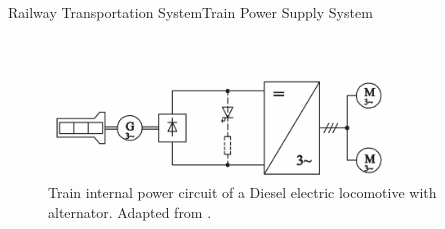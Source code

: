 \begin{frame}{Railway Transportation System}{Train Power Supply System}
\begin{minipage}[t]{0.24\linewidth} ~ \end{minipage}
\begin{minipage}[t]{0.48\linewidth}
	
	\begin{figure}[ht!]
		\centering
		\includegraphics[width=0.8\textwidth,keepaspectratio]{figures/31.PowerS/steimel2008c}
		\caption{Train internal power circuit of a Diesel electric locomotive with alternator. Adapted from \cite{steimel2008}.}
	\end{figure}
\end{minipage}

\end{frame}

